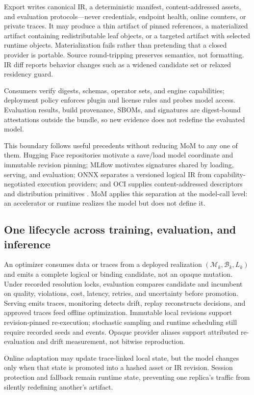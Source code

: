 Export writes canonical IR, a deterministic manifest, content-addressed assets,
and evaluation protocols---never credentials, endpoint health, online counters,
or private traces. It may produce a thin artifact of pinned references, a
materialized artifact containing redistributable leaf objects, or a targeted
artifact with selected runtime objects. Materialization fails rather than
pretending that a closed provider is portable. Source round-tripping preserves
semantics, not formatting. IR diff reports behavior changes such as a widened
candidate set or relaxed residency guard.

Consumers verify digests, schemas, operator sets, and engine capabilities;
deployment policy
enforces plugin and license rules and probes model access. Evaluation results,
build provenance, SBOMs, and signatures are digest-bound attestations outside
the bundle, so new evidence does not redefine the evaluated model.

This boundary follows useful precedents without reducing MoM to any one of
them. Hugging Face repositories motivate a save/load model coordinate and
immutable revision pinning; MLflow motivates signatures shared by loading,
serving, and evaluation; ONNX separates a versioned logical IR from
capability-negotiated execution providers; and OCI supplies content-addressed
descriptors and distribution primitives
\citep{huggingface_2026_models,mlflow_2026_model_format,
onnx_2026_ir,onnxruntime_2026_execution_providers,oci_2025_image_spec}.
MoM applies this separation at the model-call level: an accelerator or runtime
realizes the model but does not define it.

\subsection{One lifecycle across training, evaluation, and inference}

An optimizer consumes data or traces from a deployed realization
$(\mathcal{M}_k,\mathcal{B}_k,L_k)$ and emits a complete logical or binding
candidate, not an opaque mutation. Under recorded resolution locks, evaluation
compares candidate and incumbent on quality, violations, cost, latency, retries,
and uncertainty before promotion. Serving emits traces, monitoring detects
drift, replay reconstructs decisions, and approved traces feed offline
optimization. Immutable local revisions support revision-pinned re-execution;
stochastic sampling and runtime scheduling still require recorded seeds and
events. Opaque provider aliases support attributed re-evaluation and drift
measurement, not bitwise reproduction.

Online adaptation may update trace-linked local state, but the model changes
only when that state is promoted into a hashed asset or IR revision.  Session
protection and fallback remain runtime state, preventing one replica's traffic
from silently redefining another's artifact.
